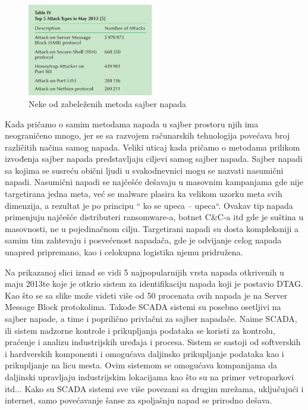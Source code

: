 \documentclass[a4paper]{article}
\begin{document}
{ \begin{figure}[h!]
  \centering
  \begin{center}
  \includegraphics[width=55mm]{slika2.jpg}
  \end{center}
  \caption{Neke od zabeleženih metoda sajber napada}
  \label{fig:vr1}
\end{figure}


Kada pričamo o samim metodama napada u sajber prostoru njih ima neograničeno mnogo, jer se sa razvojem računarskih tehnologija povećava broj različitih načina samog napada. Veliki uticaj kada pričamo o metodama prilikom izvođenja sajber napada predstavljaju ciljevi samog sajber napada. Sajber napadi sa kojima se susreću obični ljudi u svakodnevnici mogu se nazvati nasumični napadi. Nasumični napadi se najčešće dešavaju u masovnim kampanjama gde nije targetirana jedna meta, već se malware plasira ka velikom uzorku meta svih dimenzija, a rezultat je po principu “ ko se upeca – upeca“. Ovakav tip napada primenjuju najčešće distributeri ransomware-a, botnet C&C-a itd gde je suština u masovnosti, ne u pojedinačnom cilju.
Targetirani napadi su dosta kompleksniji a samim tim zahtevaju i posvećenost napadača, gde je odvijanje celog napada unapred pripremano, kao i celokupna logistika njemu pridružena.

Na prikazanoj slici iznad se vidi 5 najpopularnijih vrsta napada otkrivenih u maju 2013te koje je otkrio sistem za identifikaciju napada koji je postavio DTAG. Kao što se sa slike može videti više od 50 procenata ovih napada je na Server Message Block protokolima.
Takođe SCADA sistemi su posebno osetljivi na sajber napade, a time i poprilično privlačni za sajber napadače. Naime SCADA, ili sistem nadzorne kontrole i prikupljanja podataka se koristi za kontrolu, praćenje i analizu industrijskih uređaja i procesa.
Sistem se sastoji od softverskih i hardverskih komponenti i omogućava daljinsko prikupljanje podataka kao i prikupljanje na licu mesta. Ovim sistemom se omogućava kompanijama da daljinski upravljaju industrijskim lokacijama kao što su na primer vetroparkovi itd...
Kako su SCADA sistemi sve više povezani sa drugim mrežama, uključujući i internet, samo povećavanje šanse za spoljašnju napad se prirodno dešava.



}
\end{document}
